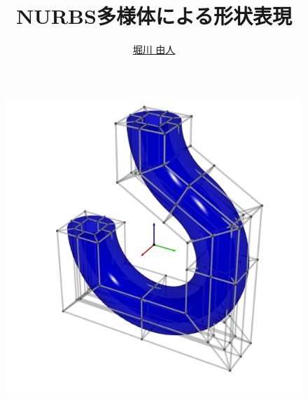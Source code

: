 \documentclass{jsarticle}
\title{NURBS多様体による形状表現}
\author{\href{https://hyrodium.github.io/Profile}{堀川 由人}}
\theoremstyle{definition}%
\begin{document}
\maketitle
\vspace{2em}
\begin{figure}[H]
	\centering
    \includegraphics[width=160mm]{cover.png}
\end{figure}

\thispagestyle{empty}
\newpage

\end{document}
